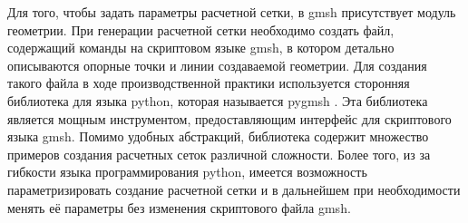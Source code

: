 Для того, чтобы задать параметры расчетной сетки, в gmsh присутствует модуль геометрии. При генерации расчетной сетки 
необходимо создать файл, содержащий команды на скриптовом языке gmsh, в котором детально описываются опорные точки и 
линии создаваемой геометрии. Для создания такого файла в ходе производственной практики используется сторонняя 
библиотека для языка python, которая называется pygmsh \cite{pygmsh_doc}. Эта библиотека является мощным инструментом, 
предоставляющим интерфейс для скриптового языка gmsh. Помимо удобных абстракций, библиотека содержит множество 
примеров создания расчетных сеток различной сложности. Более того, из за гибкости языка программирования python, 
имеется возможность параметризировать создание расчетной сетки и в дальнейшем при необходимости менять её параметры 
без изменения скриптового файла gmsh.